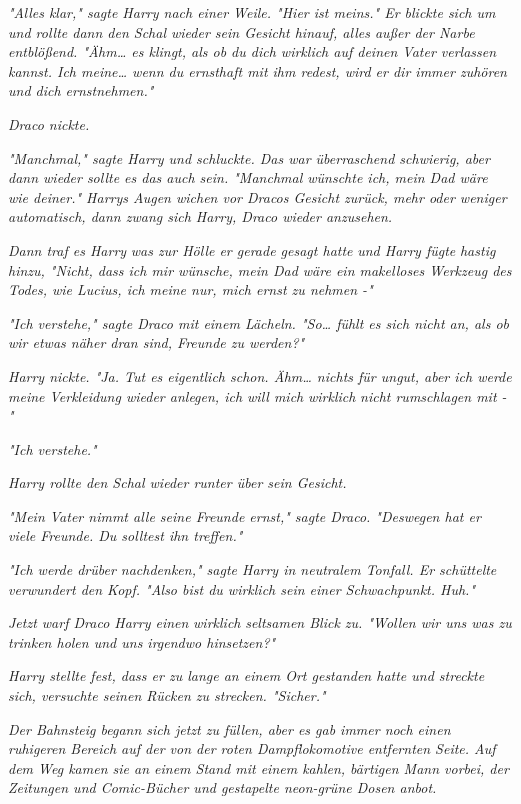 {\emph{"Alles klar," sagte Harry nach einer Weile. "Hier ist meins." Er blickte sich um und rollte dann den Schal wieder sein Gesicht hinauf, alles außer der Narbe entblößend. "Ähm… es klingt, als ob du dich wirklich auf deinen Vater verlassen kannst. Ich meine… wenn du ernsthaft mit ihm redest, wird er dir immer zuhören und dich ernstnehmen."}

\emph{Draco nickte.}

\emph{"Manchmal," sagte Harry und schluckte. Das war überraschend schwierig, aber dann wieder sollte es das auch sein. "Manchmal wünschte ich, mein Dad wäre wie deiner." Harrys Augen wichen vor Dracos Gesicht zurück, mehr oder weniger automatisch, dann zwang sich Harry, Draco wieder anzusehen.}

\emph{Dann traf es Harry} \emph{\emph{was zur Hölle er gerade gesagt hatte}} \emph{und Harry fügte} \emph{hastig hinzu, "Nicht, dass ich mir wünsche, mein Dad wäre ein makelloses Werkzeug des Todes, wie Lucius, ich meine nur, mich ernst zu nehmen -"}

\emph{"Ich verstehe," sagte Draco mit einem Lächeln. "So… fühlt es sich nicht an, als ob wir etwas näher dran sind, Freunde zu werden?"}

\emph{Harry nickte. "Ja. Tut es eigentlich schon. Ähm… nichts für ungut, aber ich werde meine Verkleidung wieder anlegen, ich will mich} \emph{\emph{wirklich}} \emph{nicht rumschlagen mit -"}

\emph{"Ich verstehe."}

\emph{Harry rollte den Schal wieder runter über sein Gesicht.}

\emph{"Mein Vater nimmt alle seine Freunde ernst," sagte Draco. "Deswegen hat er viele Freunde. Du solltest ihn treffen."}

\emph{"Ich werde drüber nachdenken," sagte Harry in neutralem Tonfall. Er schüttelte verwundert den Kopf. "Also bist du wirklich sein einer Schwachpunkt. Huh."}

\emph{Jetzt warf Draco Harry einen} \emph{\emph{wirklich}} \emph{seltsamen Blick zu. "Wollen wir uns was zu trinken holen und uns irgendwo hinsetzen?"}

\emph{Harry stellte fest, dass er zu lange an einem Ort gestanden hatte und streckte sich, versuchte seinen Rücken zu strecken. "Sicher."}

\emph{Der Bahnsteig begann sich jetzt zu füllen, aber es gab immer noch einen ruhigeren Bereich auf der von der roten Dampflokomotive entfernten Seite. Auf dem Weg kamen sie an einem Stand mit einem kahlen, bärtigen Mann vorbei, der Zeitungen und Comic-Bücher und gestapelte neon-grüne Dosen anbot.}

}
